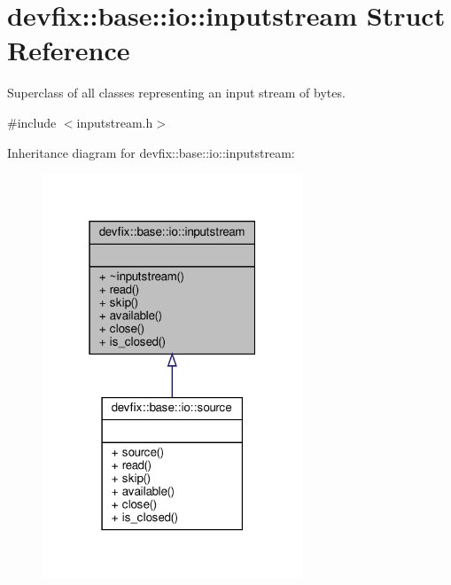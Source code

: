\hypertarget{structdevfix_1_1base_1_1io_1_1inputstream}{}\section{devfix\+:\+:base\+:\+:io\+:\+:inputstream Struct Reference}
\label{structdevfix_1_1base_1_1io_1_1inputstream}


Superclass of all classes representing an input stream of bytes.  




{\ttfamily \#include $<$inputstream.\+h$>$}



Inheritance diagram for devfix\+:\+:base\+:\+:io\+:\+:inputstream\+:\nopagebreak
\begin{figure}[H]
\begin{center}
\leavevmode
\includegraphics[width=220pt]{structdevfix_1_1base_1_1io_1_1inputstream__inherit__graph}
\end{center}
\end{figure}
